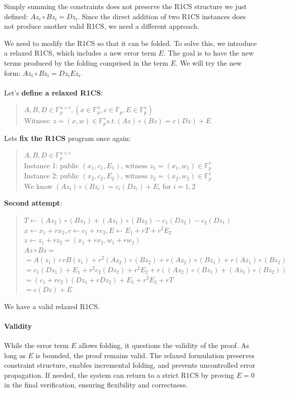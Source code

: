 Simply summing the constraints does not preserve the R1CS structure we just defined: $Az_i \circ Bz_i = Dz_i$.
Since the direct addition of two R1CS instances does not produce another valid R1CS, we need a different approach.

We need to modify the R1CS so that it can be folded.
To solve this, we introduce a relaxed R1CS, which includes a new error term $E$.
The goal is to have the new terms produced by the folding comprised in the term $E$.
We will try the new form: $Az_i \circ Bz_i = Dz_i Ez_i$.
\\
\\
Let's \textbf{define a relaxed R1CS}:
\begin{quote}
$A, B,D \in \mathbb{F}^{u \times v}_p, (x \in \mathbb{F}^n_p, c \in \mathbb{F}_p, E \in \mathbb{F}^u_p) $
\\
Witness: $ z = (x,w) \in \mathbb{F}^v_p s.t. (Az) \circ (Bz) = c(Dz) + E$
\end{quote}
Lets \textbf{fix the R1CS} program once again:
\begin{quote}
$A,B,D \in \mathbb{F}^{u \times v}_p $
\\
Instance 1: public $ (x_1,c_1,E_1)$, witness $z_1 = (x_1, w_1) \in \mathbb{F}^v_p$
\\
Instance 2: public $(x_2,c_2,E_2)$, witness $ z_2 = (x_2, w_2) \in \mathbb{F}^v_p$
\\
We know $(Az_i) \circ (Bz_i) = c_i(Dz_i) + E_i$ for $ i = 1,2$
\end{quote}


\textbf{Second attempt}:
\begin{quote}
$T \leftarrow (Az_2) \circ (Bz_1) + (Az_1) \circ (Bz_2) - c_1(Dz_2) - c_2(Dz_1)$
\\
$x \leftarrow x_1 + rx_2, c \leftarrow c_1 + rc_2, E \leftarrow E_1 + rT +r^2E_2$
\\
$z \leftarrow z_1 + rz_2 = (x_1 +rx_2, w_1 + rw_2)$
\\
$Az \circ Bz = $
\\
$=A(z_1) \circ rB(z_1) +r^2(Az_2) \circ (Bz_2) + r(Az_2) \circ (Bz_1) + r(Az_1) \circ (Bz_2)$
\\
$=c_1(Dz_1) + E_1 + r^2c_2(Dz_2) + r^2E_2+r((Az_2) \circ (Bz_1) + (Az_1) \circ (Bz_2))$
\\
$=(c_1+rc_2)(Dz_1+rDz_2)+E_1+r^2E_2+rT$
\\
$=c(Dz) + E$
\end{quote}
We have a valid relaxed R1CS.

\paragraph{Validity}
While the error term $E$ allows folding, it questions the validity of the proof. As long as $E$ is bounded, the proof remains valid. 
The relaxed formulation preserves constraint structure, enables incremental folding, and prevents uncontrolled error propagation. 
If needed, the system can return to a strict R1CS by proving $E = 0$ in the final verification, ensuring flexibility and correctness.
\cite{Nova23}